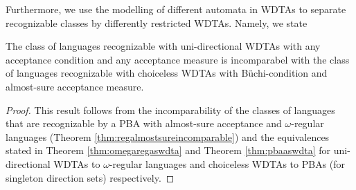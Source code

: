Furthermore, we use the modelling of different automata in \acp{WDTA} to 
separate recognizable classes by differently restricted \acp{WDTA}. Namely,
we state
\begin{proposition}
  The class of languages recognizable with uni-directional \acp{WDTA} with any
  acceptance condition and any acceptance measure is incomparabel with 
  the class of languages recognizable with choiceless 
  \acp{WDTA} with Büchi-condition and almost-sure acceptance measure.
\end{proposition}
\begin{proof}
  This result follows from the incomparability of the classes of languages that
  are recognizable by a \ac{PBA} with almost-sure acceptance and 
  $\omega$-regular languages (Theorem \ref{thm:regalmostsureincomparable}) and
  the equivalences stated in Theorem \ref{thm:omegaregaswdta} and Theorem 
  \ref{thm:pbaaswdta} for uni-directional \acp{WDTA} to 
  $\omega$-regular languages and choiceless \acp{WDTA} to \acp{PBA} (for 
  singleton direction sets) respectively.
\end{proof}

